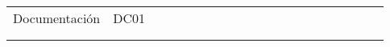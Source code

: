\begin{longtable}[c]{llclllllllllllllllll}
        \multicolumn{1}{|l|}{Documentación}                                                                                     & \multicolumn{1}{l|}{DC01}                                                      & \multicolumn{1}{l|}{}                                                            & \multicolumn{1}{l|}{}                                                                &                                 &                                 &                                 &                                 &                                 &                                 &                                 &                                 &                                 &                                 &                                 &                                 &                                 &                                 & \multicolumn{1}{l|}{}                         &  \\ \cline{1-19}
        \multicolumn{4}{|l|}{}                                                                                                                                                                                                                                                                                                                                                             & \multicolumn{15}{l|}{}                                                                                                                                                                                                                                                                                                                                                                                                                                                                                                                    &  \\ \cline{1-19}
        \multicolumn{1}{|l|}{}                                                                                                  & \multicolumn{1}{l|}{}                                                          & \multicolumn{1}{l|}{}                                                            & \multicolumn{1}{l|}{}                                                                &                                 &                                 &                                 &                                 &                                 &                                 &                                 &                                 &                                 &                                 &                                 &                                 &                                 &                                 & \multicolumn{1}{l|}{}                         &  \\ \cline{1-19}

\end{longtable}
